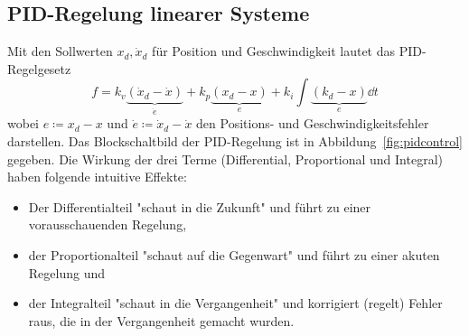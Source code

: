 		\subsection{PID-Regelung linearer Systeme}  %
			Mit den Sollwerten \( x_d, \dot{x}_d \) für Position und Geschwindigkeit lautet das PID-Regelgesetz
			\begin{equation*}
				f = k_v \underbrace{(\dot{x}_d - \dot{x})}_{\dot{e}} + k_p \underbrace{(x_d - x)}_{e} + k_i \int \! \underbrace{(k_d - x)}_{e} \dd{t}
			\end{equation*}
			wobei \( e \coloneqq x_d - x \) und \( \dot{e} \coloneqq \dot{x}_d - \dot{x} \) den Positions- und Geschwindigkeitsfehler darstellen. Das Blockschaltbild der PID-Regelung ist in Abbildung~\ref{fig:pidcontrol} gegeben. Die Wirkung der drei Terme (Differential, Proportional und Integral) haben folgende intuitive Effekte:
			\begin{itemize}
				\item Der Differentialteil "schaut in die Zukunft" und führt zu einer vorausschauenden Regelung,
				\item der Proportionalteil "schaut auf die Gegenwart" und führt zu einer akuten Regelung und
				\item der Integralteil "schaut in die Vergangenheit" und korrigiert (regelt) Fehler raus, die in der Vergangenheit gemacht wurden.
			\end{itemize}
		

